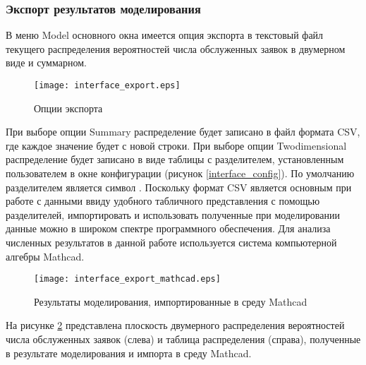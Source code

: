 \subsubsection{Экспорт результатов моделирования}
В меню Model основного окна имеется опция экспорта в текстовый файл текущего распределения вероятностей числа обслуженных заявок в двумерном виде и суммарном.
\begin{figure}[H]
	\centering
	\texttt{[image: interface\_export.eps]}
	\caption{Опции экспорта}
	\label{interface_export}
\end{figure}
При выборе опции Summary распределение будет записано в файл формата CSV, где каждое значение будет с новой строки. При выборе опции Twodimensional распределение будет записано в виде таблицы с разделителем, установленным пользователем в окне конфигурации (рисунок \ref{interface_config}). По умолчанию разделителем является символ \textquote{;}. Поскольку формат CSV является основным при работе с данными ввиду удобного табличного представления с помощью разделителей, импортировать и использовать полученные при моделировании данные можно в широком спектре программного обеспечения. Для анализа численных результатов в данной работе используется система компьютерной алгебры Mathcad.
\begin{figure}[H]
	\centering
	\texttt{[image: interface\_export\_mathcad.eps]}
	\caption{Результаты моделирования, импортированные в среду Mathcad}
	\label{interface_export_mathcad}
\end{figure}
На рисунке \ref{interface_export_mathcad} представлена плоскость двумерного распределения вероятностей числа обслуженных заявок (слева) и таблица распределения (справа), полученные в результате моделирования и импорта в среду Mathcad.
\clearpage

